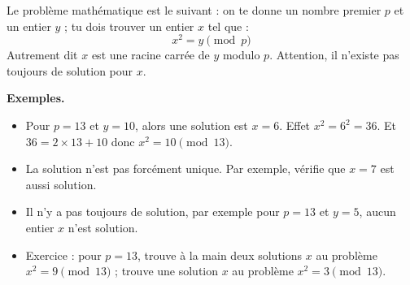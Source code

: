 \documentclass[11pt,class=report,crop=false]{standalone}
\begin{document}




\begin{activite}



Le problème mathématique est le suivant : on te donne un nombre premier $p$  et un entier $y$ ; tu dois trouver un entier $x$ tel que :
$$x^2 = y \pmod{p}$$
Autrement dit $x$ est une racine carrée de $y$ modulo $p$.
Attention, il n'existe pas toujours de solution pour $x$. 

\textbf{Exemples.}
\begin{itemize}
  \item Pour $p=13$ et $y = 10$, alors une solution est $x = 6$.
  Effet $x^2 = 6^2 = 36$. Et $36 = 2\times 13 + 10$ donc $x^2 = 10 \pmod{13}$.
  
  \item La solution n'est pas forcément unique. Par exemple, vérifie que $x=7$ est aussi solution.
  
  \item Il n'y a pas toujours de solution, par exemple pour $p=13$ et $y=5$, aucun entier $x$ n'est solution.
  
  \item Exercice : pour $p = 13$, trouve à la main deux solutions $x$ au problème $x^2 = 9 \pmod{13}$ ; trouve une solution $x$ au problème $x^2 = 3 \pmod{13}$.
  

\end{itemize}
\end{activite}
\end{document}
